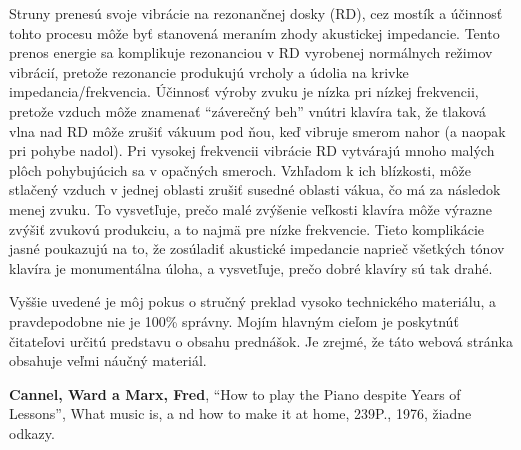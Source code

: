 \documentclass[11pt,a4paper]{book}
\begin{document}
Struny prenesú svoje vibrácie na rezonančnej dosky (RD), cez mostík a účinnosť tohto procesu môže byť stanovená meraním zhody akustickej impedancie. Tento prenos energie sa komplikuje rezonanciou v RD vyrobenej normálnych režimov vibrácií, pretože rezonancie produkujú vrcholy a údolia na krivke impedancia/frekvencia. Účinnosť výroby zvuku je nízka pri nízkej frekvencii, pretože vzduch môže znamenať “záverečný beh” vnútri klavíra tak, že tlaková vlna nad RD môže zrušiť vákuum pod ňou, keď vibruje smerom nahor (a naopak pri pohybe nadol). Pri vysokej frekvencii vibrácie RD vytvárajú mnoho malých plôch pohybujúcich sa v opačných smeroch. Vzhľadom k ich blízkosti, môže stlačený vzduch v jednej oblasti zrušiť susedné oblasti vákua, čo má za následok menej zvuku. To vysvetľuje, prečo malé zvýšenie veľkosti klavíra môže výrazne zvýšiť zvukovú produkciu, a to najmä pre nízke frekvencie. Tieto komplikácie jasné poukazujú na to, že zosúladiť akustické impedancie naprieč všetkých tónov klavíra je monumentálna úloha, a vysvetľuje, prečo dobré klavíry sú tak drahé. 

Vyššie uvedené je môj pokus o stručný preklad vysoko technického materiálu, a pravdepodobne nie je 100\% správny. Mojím hlavným cieľom je poskytnúť čitateľovi určitú predstavu o obsahu prednášok. Je zrejmé, že táto webová stránka obsahuje veľmi náučný materiál. 

\textbf{Cannel, Ward a Marx, Fred}, “How to play the Piano despite Years of Lessons”, What music is, a nd how to make it at home, 239P., 1976, žiadne odkazy. 
\end{document}
